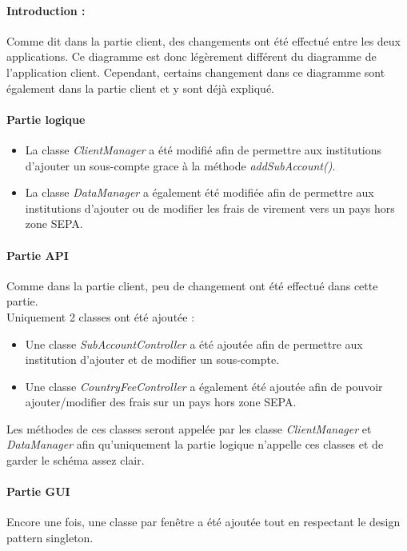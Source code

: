 \paragraph{Introduction :} Comme dit dans la partie client, des changements ont été effectué
entre les deux applications. Ce diagramme est donc légèrement différent du diagramme de l'application client.
Cependant, certains changement dans ce diagramme sont également dans la partie client et y sont déjà expliqué.

\paragraph{Partie logique}
\begin{itemize}
    \item La classe \emph{ClientManager} a été modifié afin de permettre aux institutions d'ajouter un sous-compte grace à la méthode \emph{addSubAccount()}.
    \item La classe \emph{DataManager} a également été modifiée afin de permettre aux institutions d'ajouter ou de modifier les frais de virement vers un pays hors zone SEPA.
\end{itemize}


\paragraph{Partie API}
Comme dans la partie client, peu de changement ont été effectué dans cette partie.\\
Uniquement 2 classes ont été ajoutée : 
\begin{itemize}
    \item Une classe \emph{SubAccountController} a été ajoutée afin de permettre aux institution d'ajouter et de modifier un sous-compte.
    \item Une classe \emph{CountryFeeController} a également été ajoutée afin de pouvoir ajouter/modifier des frais sur un pays hors zone SEPA.
\end{itemize}
Les méthodes de ces classes seront appelée par les classe \emph{ClientManager} et \emph{DataManager} afin qu'uniquement la partie logique n'appelle ces classes et de garder le schéma assez clair.

\paragraph{Partie GUI}
Encore une fois, une classe par fenêtre a été ajoutée tout en respectant le design pattern singleton.